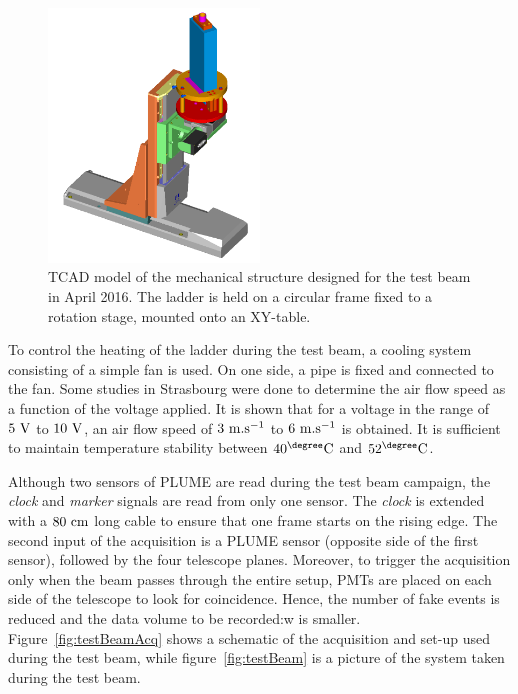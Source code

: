       \begin{figure}[!b]
        \centering
        \includegraphics[width = 0.5\textwidth]{Pictures/X0/Frame/Testbeam1.PNG}
        \caption{TCAD model of the mechanical structure designed for the test beam in April 2016. The ladder is held on a circular frame fixed to a rotation stage, mounted onto an XY-table.}
        \label{fig:mechanics}
      \end{figure}

      To control the heating of the ladder during the test beam, a cooling system consisting of a simple fan is used.
      On one side, a pipe is fixed and connected to the fan.
      Some studies in Strasbourg were done to determine the air flow speed as a function of the voltage applied.
      It is shown that for a voltage in the range of $5~\rm{V}$ to $10~\rm{V}$, an air flow speed of $3~\rm{m.s^{-1}}$ to $6~\rm{m.s^{-1}}$ is obtained.
      It is sufficient to maintain temperature stability between $40^{\degree}\rm{C}$ and $52^{\degree}\rm{C}$.

      Although two sensors of \gls{PLUME} are read during the test beam campaign, the \textit{clock} and \textit{marker} signals are read from only one sensor.
      The \textit{clock} is extended with a $80~\rm{cm}$ long cable to ensure that one frame starts on the rising edge.
      The second input of the acquisition is a \gls{PLUME} sensor (opposite side of the first sensor), followed by the four telescope planes. 
      Moreover, to trigger the acquisition only when the beam passes through the entire setup, \gls{PMT}s are placed on each side of the telescope to look for coincidence.
      Hence, the number of fake events is reduced and the data volume to be recorded:w
       is smaller.
      Figure~\ref{fig:testBeamAcq} shows a schematic of the acquisition and set-up used during the test beam, while figure~\ref{fig:testBeam} is a picture of the system taken during the test beam.

